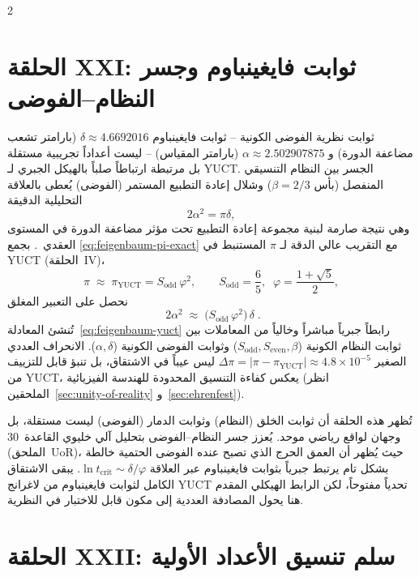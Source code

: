 \documentclass[12pt,a4paper]{article}
\begin{document}
\begin{multicols}{2}
		\section{الحلقة XXI: ثوابت فايغينباوم وجسر النظام–الفوضى}
		
		ثوابت نظرية الفوضى الكونية – ثوابت فايغينباوم
		\(\delta \approx 4.6692016\) (بارامتر تشعب مضاعفة الدورة) و
		\(\alpha \approx 2.502907875\) (بارامتر المقياس) – ليست أعداداً تجريبية مستقلة بل مرتبطة ارتباطاً صلباً بالهيكل الجبري لـ YUCT.
		الجسر بين النظام التنسيقي المنفصل (بأس \(\beta=2/3\)) وشلال إعادة التطبيع المستمر (الفوضى) يُعطى بالعلاقة التحليلية الدقيقة
		\begin{equation}
			2\alpha^2 = \pi \delta,
			\label{eq:feigenbaum-pi-exact}
		\end{equation}
		وهي نتيجة صارمة لبنية مجموعة إعادة التطبيع تحت مؤثر مضاعفة الدورة في المستوى العقدي~\cite{Feigenbaum1978}.
		بجمع \ref{eq:feigenbaum-pi-exact} مع التقريب عالي الدقة لـ \(\pi\) المستنبط في YUCT (الحلقة~IV)،
		\begin{equation}
			\pi \;\approx\; \pi_{\mathrm{YUCT}} = S_{\mathrm{odd}}\,\varphi^2,
			\qquad
			S_{\mathrm{odd}} = \frac{6}{5},\;\; \varphi = \frac{1+\sqrt{5}}{2},
		\end{equation}
		نحصل على التعبير المغلق
		\begin{equation}
			\boxed{\;
				2\alpha^2 \;\approx\; \bigl(S_{\mathrm{odd}}\,\varphi^2\bigr)\,\delta
				\;}.
			\label{eq:feigenbaum-yuct}
		\end{equation}
		تُنشئ المعادلة~\ref{eq:feigenbaum-yuct} رابطاً جبرياً مباشراً وخالياً من المعاملات بين ثوابت النظام الكونية (\(S_{\mathrm{odd}}, S_{\mathrm{even}}, \beta\)) وثوابت الفوضى الكونية (\(\alpha, \delta\)). الانحراف العددي الصغير
		\(\Delta\pi = |\pi - \pi_{\mathrm{YUCT}}| \approx 4.8\times10^{-5}\)
		ليس عيباً في الاشتقاق، بل تنبؤ قابل للتزييف من YUCT، يعكس كفاءة التنسيق المحدودة للهندسة الفيزيائية (انظر الملحقين~\ref{sec:unity-of-reality} و~\ref{sec:ehrenfest}).
		
		تُظهر هذه الحلقة أن ثوابت الخلق (النظام) وثوابت الدمار (الفوضى) ليست مستقلة، بل وجهان لواقع رياضي موحد. يُعزز جسر النظام–الفوضى بتحليل آلي خليوي القاعدة~30 (الملحق~UoR)، حيث يُظهر أن العمق الحرج الذي تصبح عنده الفوضى الحتمية خالطة بشكل تام يرتبط جبرياً بثوابت فايغينباوم عبر العلاقة \(\ln t_{\mathrm{crit}} \sim \delta/\varphi\). يبقى الاشتقاق الكامل لثوابت فايغينباوم من لاغرانج YUCT تحدياً مفتوحاً، لكن الرابط الهيكلي المقدم هنا يحول المصادفة العددية إلى مكون قابل للاختبار في النظرية.
		
		\section{الحلقة XXII: سلم تنسيق الأعداد الأولية}
		

\end{multicols}
\end{document}

